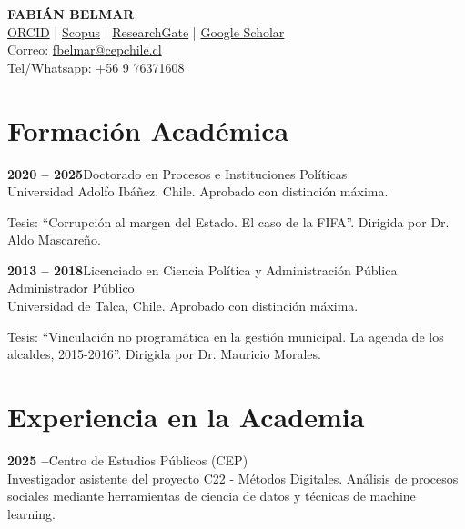 \documentclass[11pt,a4paper]{article}
\newcommand{\cventry}[2]{\noindent\textbf{#1}\hfill #2\\}
\newcommand{\cventrysub}[1]{\noindent\hspace{0.5cm}#1\par\vspace{2pt}}
\begin{document}
\begin{center}
    {\LARGE\bfseries FABIÁN BELMAR}\\[8pt]
    \href{https://orcid.org/0000-0003-4239-1874}{ORCID} |
    \href{https://www.scopus.com/authid/detail.uri?authorId=57220090371}{Scopus} |
    \href{https://www.researchgate.net/profile/Fabian-Belmar-3}{ResearchGate} |
    \href{https://scholar.google.es/citations?user=wr6beBsAAAAJ}{Google Scholar}\\[4pt]
    Correo: \href{mailto:fbelmar@cepchile.cl}{fbelmar@cepchile.cl}\\
    Tel/Whatsapp: +56 9 76371608
\end{center}

\vspace{10pt}

\section{Formación Académica}

\cventry{2020 -- 2025}{Doctorado en Procesos e Instituciones Políticas}
\cventrysub{Universidad Adolfo Ibáñez, Chile. Aprobado con distinción máxima.}
\cventrysub{Tesis: ``Corrupción al margen del Estado. El caso de la FIFA''. Dirigida por Dr. Aldo Mascareño.}

\vspace{6pt}

\cventry{2013 -- 2018}{Licenciado en Ciencia Política y Administración Pública. Administrador Público}
\cventrysub{Universidad de Talca, Chile. Aprobado con distinción máxima.}
\cventrysub{Tesis: ``Vinculación no programática en la gestión municipal. La agenda de los alcaldes, 2015-2016''. Dirigida por Dr. Mauricio Morales.}

\section{Experiencia en la Academia}

\cventry{2025 --}{Centro de Estudios Públicos (CEP)}
\cventrysub{Investigador asistente del proyecto C22 - Métodos Digitales. Análisis de procesos sociales mediante herramientas de ciencia de datos y técnicas de machine learning.}
\end{document}
